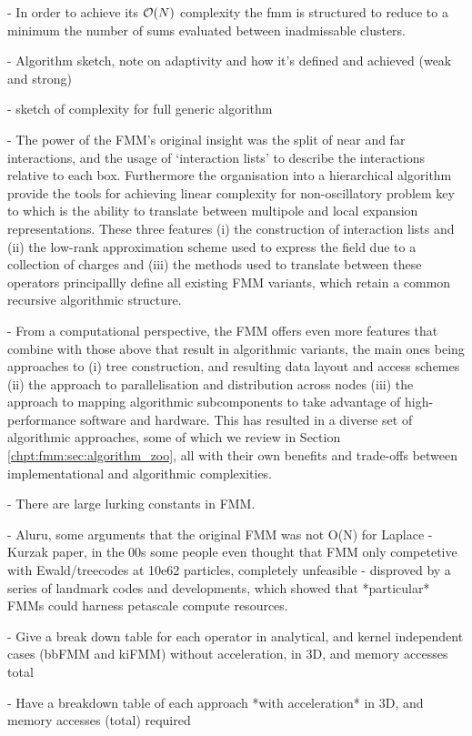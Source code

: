 - In order to achieve its $\mathcal{O}(N)$ complexity the \acrshort{fmm} is structured to reduce to a minimum the number of sums evaluated between inadmissable clusters.

- Algorithm sketch, note on adaptivity and how it's defined and achieved (weak and strong)

- sketch of complexity for full generic algorithm

- The power of the FMM's original insight was the split of near and far interactions, and the usage of `interaction lists' to describe the interactions relative to each box. Furthermore the organisation into a hierarchical algorithm provide the tools for achieving linear complexity for non-oscillatory problem key to which is the ability to translate between multipole and local expansion representations. These three features (i) the construction of interaction lists and (ii) the low-rank approximation scheme used to express the field due to a collection of charges and (iii) the methods used to translate between these operators principallly define all existing FMM variants, which retain a common recursive algorithmic structure.

- From a computational perspective, the FMM offers even more features that combine with those above that result in algorithmic variants, the main ones being approaches to (i) tree construction, and resulting data layout and access schemes (ii) the approach to parallelisation and distribution across nodes (iii) the approach to mapping algorithmic subcomponents to take advantage of high-performance software and hardware.  This has resulted in a diverse set of algorithmic approaches, some of which we review in Section \ref{chpt:fmm:sec:algorithm_zoo}, all with their own benefits and trade-offs between implementational and algorithmic complexities.

- There are large lurking constants in FMM.

- Aluru, some arguments that the original FMM was not O(N) for Laplace
- Kurzak paper, in the 00s some people even thought that FMM only competetive with Ewald/treecodes at 10e62 particles, completely unfeasible
- disproved by a series of landmark codes and developments, which showed that *particular* FMMs could harness petascale compute resources.

- Give a break down table for each operator in analytical, and kernel independent cases (bbFMM and kiFMM) without acceleration, in 3D, and memory accesses total

- Have a breakdown table of each approach *with acceleration* in 3D, and memory accesses (total) required

